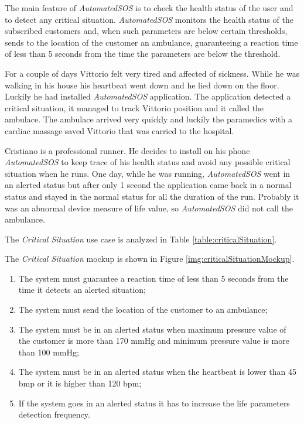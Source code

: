 The main feature of \textit{AutomatedSOS} is to check the health status of the user and to detect any critical situation.
\textit{AutomatedSOS} monitors the health status of the subscribed customers and, when such parameters are below certain thresholds, sends to the location of the customer an ambulance, guaranteeing a reaction time of less than 5 seconds from the time the parameters are below the threshold.

For a couple of days Vittorio felt very tired and affected of sickness. While he was walking in his house his heartbeat went down and he lied down on the floor. Luckily he had installed \textit{AutomatedSOS} application.
The application detected a critical situation, it managed to track Vittorio position and it called the ambulace.
The ambulace arrived very quickly and luckily the paramedics with a cardiac massage saved Vittorio that was carried to the hospital.

Cristiano is a professional runner. He decides to install on his phone \textit{AutomatedSOS} to keep trace of his health status and avoid any possible critical situation when he runs.
One day, while he was running, \textit{AutomatedSOS} went in an alerted status but after only 1 second the application came back in a normal status and stayed in the normal status for all the duration of the run.
Probably it was an abnormal device measure of life value, so \textit{AutomatedSOS} did not call the ambulance.

The \textit{Critical Situation} use case is analyzed in Table \ref{table:criticalSituation}.

The \textit{Critical Situation} mockup is shown in Figure \ref{img:criticalSituationMockup}.

\begin{enumerate}
  \item The system must guarantee a reaction time of less than 5 seconds from the time it detects an alerted situation;
  \item The system must send the location of the customer to an ambulance;
  \item The system must be in an alerted status when maximum pressure value of the customer is more than 170 mmHg and minimum pressure value is more than 100 mmHg;
  \item The system must be in an alerted status when the heartbeat is lower than 45 bmp or it is higher than 120 bpm;
  \item If the system goes in an alerted status it has to increase the life parameters detection frequency.
\end{enumerate}

